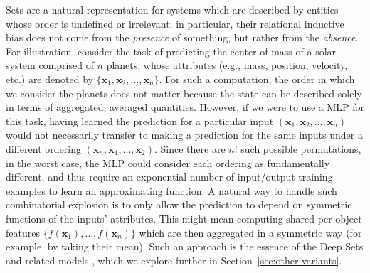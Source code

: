 Sets are a natural representation for systems which are described by entities whose order is undefined or irrelevant; in particular, their relational inductive bias does not come from the \textit{presence} of something, but rather from the \textit{absence}.
For illustration, consider the task of predicting the center of mass of a solar system comprised of $n$ planets, whose attributes (e.g., mass, position, velocity, etc.) are denoted by $\{\mathbf{x}_1, \mathbf{x}_2, \dots, \mathbf{x}_n\}$.
For such a computation, the order in which we consider the planets does not matter because the state can be described solely in terms of aggregated, averaged quantities.
However, if we were to use a MLP for this task, having learned the prediction for a particular input $(\mathbf{x}_1, \mathbf{x}_2, \dots, \mathbf{x}_n)$ would not necessarily transfer to making a prediction for the same inputs under a different ordering $(\mathbf{x}_n, \mathbf{x}_1, \dots, \mathbf{x}_2)$.
Since there are $n!$ such possible permutations, in the worst case, the MLP could consider each ordering as fundamentally different, and thus require an exponential number of input/output training examples to learn an approximating function.
A natural way to handle such combinatorial explosion is to only allow the prediction to depend on symmetric functions of the inputs' attributes.
This might mean computing shared per-object features $\{f(\mathbf{x}_1), \dots, f(\mathbf{x}_n)\}$ which are then aggregated in a symmetric way (for example, by taking their mean).
Such an approach is the essence of the Deep Sets and related models \citep{zaheer2017deep,edwards2016towards,pevny2017using}, which we explore further in Section~\ref{sec:other-variants}.

